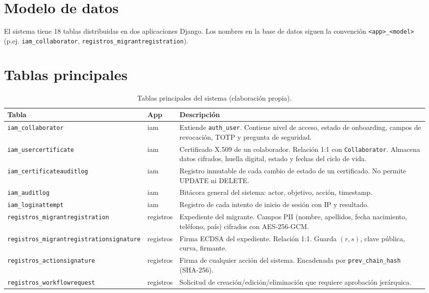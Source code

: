 \documentclass[10pt,letterpaper]{report}
\begin{document}
\section{Modelo de datos}

El sistema tiene 18 tablas distribuidas en dos aplicaciones Django. Los nombres en la base de datos siguen la convención \texttt{<app>\_<model>} (p.ej. \texttt{iam\_collaborator}, \texttt{registros\_migrantregistration}).

\section{Tablas principales}

\begin{table}[H]
\centering
\caption{Tablas principales del sistema (elaboración propia).}
\label{tab:tablas}
\begin{tabularx}{\textwidth}{l l X}
\toprule
\textbf{Tabla} & \textbf{App} & \textbf{Descripción} \\
\midrule
\texttt{iam\_collaborator} & iam & Extiende \texttt{auth\_user}. Contiene nivel de acceso, estado de onboarding, campos de revocación, TOTP y pregunta de seguridad. \\
\texttt{iam\_usercertificate} & iam & Certificado X.509 de un colaborador. Relación 1:1 con \texttt{Collaborator}. Almacena datos cifrados, huella digital, estado y fechas del ciclo de vida. \\
\texttt{iam\_certificateauditlog} & iam & Registro inmutable de cada cambio de estado de un certificado. No permite UPDATE ni DELETE. \\
\texttt{iam\_auditlog} & iam & Bitácora general del sistema: actor, objetivo, acción, timestamp. \\
\texttt{iam\_loginattempt} & iam & Registro de cada intento de inicio de sesión con IP y resultado. \\
\texttt{registros\_migrantregistration} & registros & Expediente del migrante. Campos PII (nombre, apellidos, fecha nacimiento, teléfono, país) cifrados con AES-256-GCM. \\
\texttt{registros\_migrantregistrationsignature} & registros & Firma ECDSA del expediente. Relación 1:1. Guarda $(r, s)$, clave pública, curva, firmante. \\
\texttt{registros\_actionsignature} & registros & Firma de cualquier acción del sistema. Encadenada por \texttt{prev\_chain\_hash} (SHA-256). \\
\texttt{registros\_workflowrequest} & registros & Solicitud de creación/edición/eliminación que requiere aprobación jerárquica. \\

\end{tabularx}
\end{table}
\end{document}
